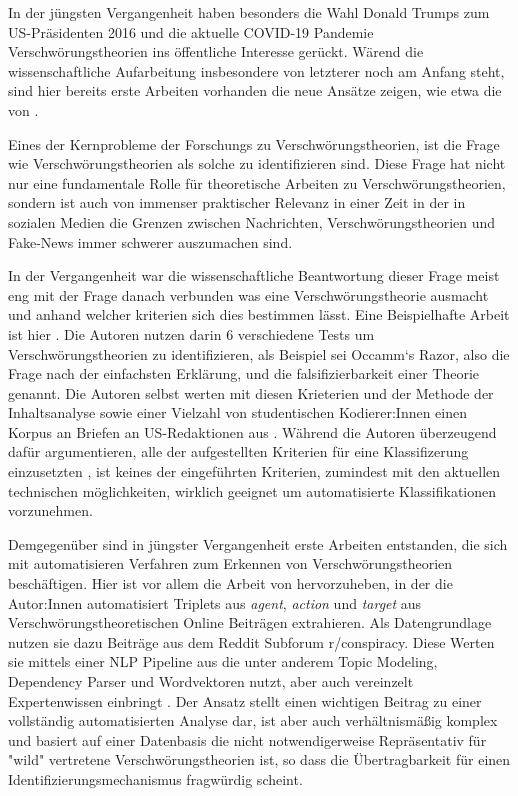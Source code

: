 In der jüngsten Vergangenheit haben besonders die Wahl Donald Trumps zum US-Präsidenten 2016 und die aktuelle COVID-19 Pandemie Verschwörungstheorien ins öffentliche Interesse gerückt.
Wärend die wissenschaftliche Aufarbeitung insbesondere von letzterer noch am Anfang steht, sind hier bereits erste Arbeiten vorhanden die neue Ansätze zeigen, wie etwa die von \textcite{shahsavari_2020}.

Eines der Kernprobleme der Forschungs zu Verschwörungstheorien, ist die Frage wie Verschwörungstheorien als solche zu identifizieren sind.
Diese Frage hat nicht nur eine fundamentale Rolle für theoretische Arbeiten zu Verschwörungstheorien, sondern ist auch von immenser praktischer Relevanz in einer Zeit in der in sozialen Medien die Grenzen zwischen Nachrichten, Verschwörungstheorien und Fake-News immer schwerer auszumachen sind.

In der Vergangenheit war die wissenschaftliche Beantwortung dieser Frage meist eng mit der Frage danach verbunden was eine Verschwörungstheorie ausmacht und anhand welcher kriterien sich dies bestimmen lässt.
Eine Beispielhafte Arbeit ist hier \textcite{uscinski_2014}.
Die Autoren nutzen darin 6 verschiedene Tests um Verschwörungstheorien zu identifizieren, als Beispiel sei Occamm`s Razor, also die Frage nach der einfachsten Erklärung, und die falsifizierbarkeit einer Theorie genannt.
Die Autoren selbst werten mit diesen Krieterien und der Methode der Inhaltsanalyse sowie einer Vielzahl von studentischen Kodierer:Innen einen Korpus an Briefen an US-Redaktionen aus \parencite[54ff]{uscinski_2014}.
Während die Autoren überzeugend dafür argumentieren, alle der aufgestellten Kriterien für eine Klassifizerung einzusetzten \parencite[52f]{uscinski_2014}, ist keines der eingeführten Kriterien, zumindest mit den aktuellen technischen möglichkeiten, wirklich geeignet um automatisierte Klassifikationen vorzunehmen.

Demgegenüber sind in jüngster Vergangenheit erste Arbeiten entstanden, die sich mit automatisieren Verfahren zum Erkennen von Verschwörungstheorien beschäftigen.
Hier ist vor allem die Arbeit von \textcite{samory_2018} hervorzuheben, in der die Autor:Innen automatisiert Triplets aus \textit{agent}, \textit{action} und \textit{target} aus Verschwörungstheoretischen Online Beiträgen extrahieren.
Als Datengrundlage nutzen sie dazu Beiträge aus dem Reddit Subforum r/conspiracy.
Diese Werten sie mittels einer NLP Pipeline aus die unter anderem Topic Modeling, Dependency Parser und Wordvektoren nutzt, aber auch vereinzelt Expertenwissen einbringt \parencite[][6ff]{samory_2018}.
Der Ansatz stellt einen wichtigen Beitrag zu einer vollständig automatisierten Analyse dar, ist aber auch verhältnismäßig komplex und basiert auf einer Datenbasis die nicht notwendigerweise Repräsentativ für "wild" vertretene Verschwörungstheorien ist, so dass die Übertragbarkeit für einen Identifizierungsmechanismus fragwürdig scheint.

